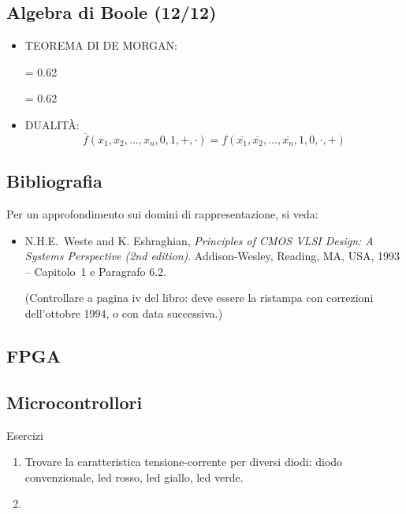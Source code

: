 \documentclass[10pt,a4paper,twoside,twocolumn]{article}
\begin{document}
\subsection{Algebra di Boole (12/12)}
\begin{itemize}
\item
TEOREMA DI DE MORGAN:
\vspace{2mm}

\epsfxsize = 0.62 \columnwidth
{}
\vspace{2mm}

\epsfxsize = 0.62 \columnwidth
{}
\vspace{2mm}

\item
DUALIT\`A:
\[ \overline{f} \left( x_1, x_2, \ldots, x_n, 0, 1, +, \cdot \right) = f \left( \overline{x_1}, \overline{x_2}, \ldots, \overline{x_n}, 1, 0, \cdot, + \right) \]
\end{itemize}



\subsection{Bibliografia}
Per un approfondimento sui domini di rappresentazione, si veda:
\begin{itemize}
\item
N.H.E.\ Weste and K. Eshraghian, \emph{Principles of CMOS VLSI Design: A Systems Perspective  (2nd edition)}. Addison-Wesley, Reading, MA, USA, 1993 -- Capitolo~1 e Paragrafo 6.2.

(Controllare a pagina iv del libro: deve essere la ristampa con correzioni dell'ottobre 1994, o con data successiva.)
\end{itemize}


\subsection{FPGA}

\subsection{Microcontrollori}


\begin{monsterbox}{Esercizi}
\begin{enumerate}
\item Trovare la caratteristica tensione-corrente per diversi diodi: diodo convenzionale, led rosso, led giallo, led verde.
\item 
\end{enumerate}
\end{monsterbox}
\end{document}

